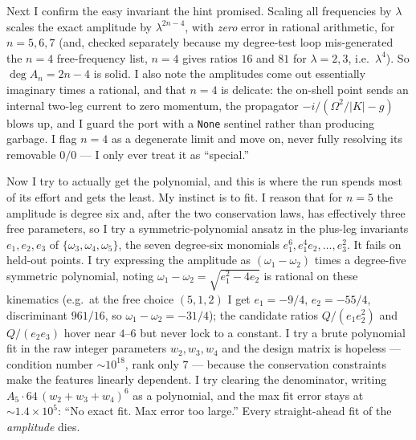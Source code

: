 \documentclass{article}
\begin{document}
Next I confirm the easy invariant the hint promised. Scaling all frequencies by
$\lambda$ scales the exact amplitude by $\lambda^{2n-4}$, with \emph{zero} error in
rational arithmetic, for $n=5,6,7$ (and, checked separately because my degree-test
loop mis-generated the $n=4$ free-frequency list, $n=4$ gives ratios $16$ and $81$
for $\lambda=2,3$, i.e.\ $\lambda^4$). So $\deg A_n=2n-4$ is solid. I also note the
amplitudes come out essentially imaginary times a rational, and that $n=4$ is
delicate: the on-shell point sends an internal two-leg current to zero momentum,
the propagator $-i/(\Omega^2/|K|-g)$ blows up, and I guard the port with a
\texttt{None} sentinel rather than producing garbage. I flag $n=4$ as a degenerate
limit and move on, never fully resolving its removable $0/0$ --- I only ever treat
it as ``special.''

Now I try to actually get the polynomial, and this is where the run spends most of
its effort and gets the least. My instinct is to fit. I reason that for $n=5$ the
amplitude is degree six and, after the two conservation laws, has effectively three
free parameters, so I try a symmetric-polynomial ansatz in the plus-leg invariants
$e_1,e_2,e_3$ of $\{\omega_3,\omega_4,\omega_5\}$, the seven degree-six monomials
$e_1^6,e_1^4e_2,\dots,e_3^2$. It fails on held-out points. I try expressing the
amplitude as $(\omega_1-\omega_2)$ times a degree-five symmetric polynomial, noting
$\omega_1-\omega_2=\sqrt{e_1^2-4e_2}$ is rational on these kinematics (e.g.\ at the
free choice $(5,1,2)$ I get $e_1=-9/4$, $e_2=-55/4$, discriminant $961/16$, so
$\omega_1-\omega_2=-31/4$); the candidate ratios $Q/(e_1e_2^2)$ and $Q/(e_2e_3)$
hover near $4$--$6$ but never lock to a constant. I try a brute polynomial fit in
the raw integer parameters $w_2,w_3,w_4$ and the design matrix is hopeless ---
condition number $\sim10^{18}$, rank only $7$ --- because the conservation
constraints make the features linearly dependent. I try clearing the denominator,
writing $A_5\cdot 64\,(w_2{+}w_3{+}w_4)^6$ as a polynomial, and the max fit error
stays at $\sim 1.4\times10^5$: ``No exact fit. Max error too large.'' Every
straight-ahead fit of the \emph{amplitude} dies.
\end{document}
